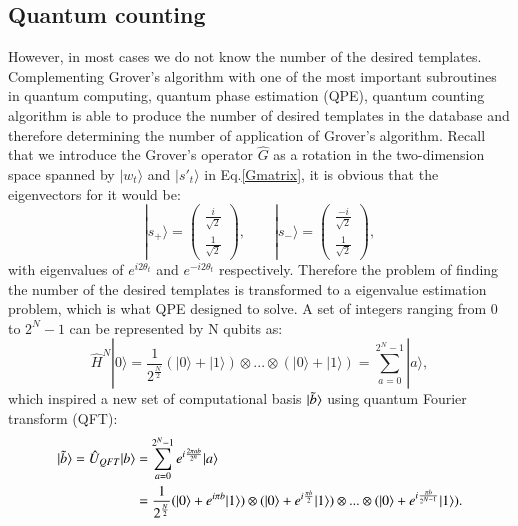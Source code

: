\documentclass[aps,prd,nofootinbib,twocolumn,reprint,superscriptaddress,showpacs,showkeys,longbibliography]{revtex4-1}
\newcommand{\ket}[1]{|#1\rangle}
\begin{document}
\subsection{Quantum counting}
However, in most cases we do not know the number of the desired templates. 
 Complementing Grover's algorithm with one of the most important subroutines in quantum computing, quantum phase estimation (QPE), quantum counting algorithm is able to produce the number of desired templates in the database and therefore determining the number of application of Grover's algorithm\cite{brassard1998quantum}. 
 \newline\newline Recall that we introduce the Grover's operator $\hat{G}$ as a rotation in the two-dimension space spanned by $\ket{w_t}$ and $\ket{s'_t}$ in Eq.\ref{Gmatrix}, it is obvious that the eigenvectors for it would be:
\begin{equation}
  \label{Geigenvector}  
    \ket{s_+}=\begin{pmatrix}
\frac{i}{\sqrt{2}} \\
\frac{1}{\sqrt{2}}
\end{pmatrix}, \qquad
\ket{s_-}=\begin{pmatrix}
\frac{-i}{\sqrt{2}} \\
\frac{1}{\sqrt{2}}
\end{pmatrix},
\end{equation}
with eigenvalues of $e^{i2\theta_t}$ and $e^{-i2\theta_t}$ respectively. Therefore the problem of finding the number of the desired templates is transformed to a eigenvalue estimation problem, which is what QPE designed to solve.  
\newline \newline A set of integers ranging from  $0$ to $2^N-1$ can be represented by N qubits as:
\begin{equation}
    \label{H0N}
    \hat{H}^N\ket{0}=\frac{1}{2^{\frac{N}{2}}}(\ket{0}+\ket{1})\otimes...\otimes(\ket{0}+\ket{1})=\sum_{a=0}^{2^N-1}\ket{a},
\end{equation}
which inspired a new set of computational basis $\ket{\Tilde{b}}$ using quantum Fourier transform (QFT)\cite{coppersmith2002approximate}:
\begin{equation}
\begin{split}
   \label{QFT}
    \ket{\Tilde{b}}=\hat{U}_{QFT}\ket{b}&=\sum_{a=0}^{2^N-1}e^{i\frac{2\pi ab}{2^n}}\ket{a}\\
    &=\frac{1}{2^{\frac{N}{2}}}(\ket{0}+e^{i\pi b}\ket{1})\otimes(\ket{0}+e^{i\frac{\pi b}{2}}\ket{1})\otimes...\otimes(\ket{0}+e^{i\frac{\pi b}{2^{N-1}}}\ket{1}).
\end{split}
\end{equation}
\end{document}
